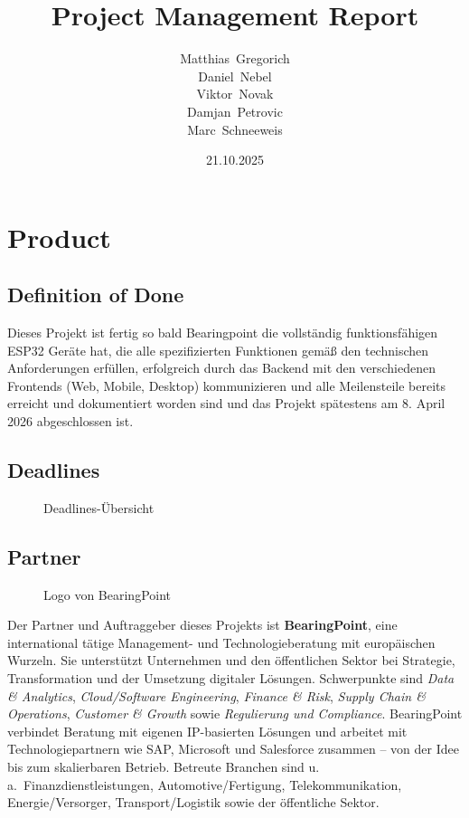 \documentclass{article}
\title{Project Management Report}
\author{Matthias~Gregorich\\Daniel~Nebel\\Viktor~Novak\\Damjan~Petrovic\\Marc~Schneeweis}
\date{21.10.2025}
\begin{document}
\maketitle
\thispagestyle{empty}

\clearpage

\setcounter{tocdepth}{2}
\setcounter{secnumdepth}{2}

\tableofcontents
\clearpage

\setcounter{page}{1}




\section{Product}
\subsection{Definition of Done}
Dieses Projekt ist fertig so bald Bearingpoint die vollständig funktionsfähigen ESP32 Geräte hat, die alle spezifizierten Funktionen gemäß den technischen Anforderungen erfüllen, erfolgreich durch das Backend mit den verschiedenen Frontends (Web, Mobile, Desktop) kommunizieren und alle Meilensteile bereits erreicht und dokumentiert worden sind und das Projekt spätestens am 8. April 2026 abgeschlossen ist.

\subsection{Deadlines}
\begin{figure}[H]
  \centering
  
  \caption{Deadlines-Übersicht}
  \label{fig:deadlines}
\end{figure}



\subsection{Partner}

\begin{figure}[h]
  \centering
   
  \caption{Logo von BearingPoint}
  \label{fig:bearingpoint-logo}
\end{figure}


\noindent
Der Partner und Auftraggeber dieses Projekts ist \textbf{BearingPoint}, eine international tätige Management- und Technologieberatung mit europäischen Wurzeln. 
Sie unterstützt Unternehmen und den öffentlichen Sektor bei Strategie, Transformation und der Umsetzung digitaler Lösungen. 
Schwerpunkte sind \emph{Data \& Analytics}, \emph{Cloud/Software Engineering}, \emph{Finance \& Risk}, \emph{Supply Chain \& Operations}, \emph{Customer \& Growth} sowie \emph{Regulierung und Compliance}. 
BearingPoint verbindet Beratung mit eigenen IP-basierten Lösungen und arbeitet mit Technologiepartnern wie SAP, Microsoft und Salesforce zusammen – von der Idee bis zum skalierbaren Betrieb. 
Betreute Branchen sind u.\,a.\ Finanzdienstleistungen, Automotive/Fertigung, Telekommunikation, Energie/Versorger, Transport/Logistik sowie der öffentliche Sektor.
\end{document}
